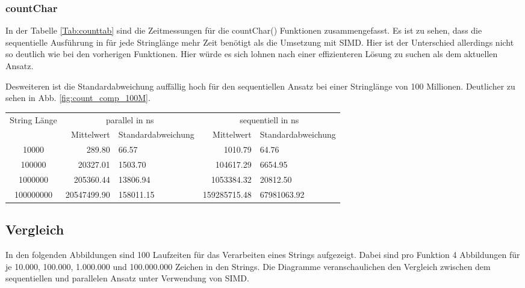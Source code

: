 \documentclass[plainarticle,zihtitle,german,final,hyperref,utf8]{zihpub}
\begin{document}
\subsubsection{countChar}
In der Tabelle \ref{Tab:counttab} sind die Zeitmessungen für die countChar() Funktionen zusammengefasst.
Es ist zu sehen, dass die sequentielle Ausführung in für jede Stringlänge mehr Zeit benötigt als die Umsetzung mit SIMD. Hier ist der Unterschied allerdings nicht so deutlich wie bei den vorherigen Funktionen. Hier würde es sich lohnen nach einer effizienteren Lösung zu suchen als dem aktuellen Ansatz.

Desweiteren ist die Standardabweichung auffällig hoch für den sequentiellen Ansatz bei einer Stringlänge von 100 Millionen. Deutlicher zu sehen in Abb. \ref{fig:count_comp_100M}.
\newline
\begin{tabular}{|c|r|l|r|l|}
	\hline
	\multicolumn{1}{|c|}{String Länge} & \multicolumn{2}{c|}{parallel in ns} & \multicolumn{2}{c|}{sequentiell in ns} \\
	\cline{2-5}
	& Mittelwert & Standardabweichung  & Mittelwert & Standardabweichung \\
	\hline
	10000 & 289.80 & 66.57 & 1010.79 & 64.76 \\
	100000 & 20327.01 & 1503.70 & 104617.29 & 6654.95 \\
	1000000 & 205360.44 & 13806.94 & 1053384.32 & 20812.50 \\
	100000000 & 20547499.90 & 158011.15 & 159285715.48 & 67981063.92 \\

	\hline
\end{tabular}
\label{Tab:counttab}

\newpage
\subsection{Vergleich}
In den folgenden Abbildungen sind 100 Laufzeiten für das Verarbeiten eines Strings aufgezeigt. Dabei sind pro Funktion 4 Abbildungen für je 10.000, 100.000, 1.000.000 und 100.000.000 Zeichen in den Strings. Die Diagramme veranschaulichen den Vergleich zwischen dem sequentiellen und parallelen Ansatz unter Verwendung von SIMD.
\end{document}
